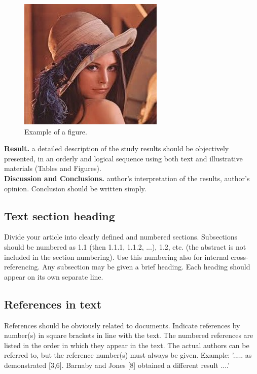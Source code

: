 \documentclass[final,3p,times,twocolumn]{elsarticle}
\begin{document}
\begin{figure}
\centering
\includegraphics[width=.8\columnwidth]{fig1.jpg}
\caption{Example of a figure.}
\label{fig:ex}
\end{figure}

\textbf{Result.} a detailed description of the study results should be objectively presented, in an orderly and logical sequence using both text and illustrative materials (Tables and Figures). \\

\textbf{Discussion and Conclusions.} author's interpretation of the results, author's opinion. Conclusion should be written simply.

\subsection{Text section heading}
Divide your article into clearly defined and numbered sections. 
Subsections should be numbered as 1.1 (then 1.1.1, 1.1.2, ...), 1.2, etc. (the abstract is not included in the section numbering). 
Use this numbering also for internal cross-referencing. Any subsection may be given a brief heading. 
Each heading should appear on its own separate line.

\subsection{References in text}
References should be obviously related to documents. 
Indicate references by number(s) in square brackets in line with the text. 
The numbered references are listed in the order in which they appear in the text.
The actual authors can be referred to, but the reference number(s) must always be given. Example: '..... as demonstrated [3,6]. 
Barnaby and Jones [8] obtained a different result ....'
\end{document}

